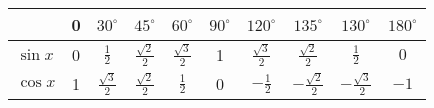 



	
 \label{sincoseksakt}
\begin{center}
	\renewcommand{\arraystretch}{1.5}	
	\begin{tabular}{l|c|c|c|c|c|c|c|c|c}
		& 0&$30^\circ$ & $45^\circ$ &$60^\circ$ & $90^\circ$ & $ 120^\circ $ & $ 135^\circ$ & $ 130^\circ $ & $ 180^\circ $    \\
		\hline
		$\sin x$ & 0 &$\frac{1}{2}$ & $\frac{\sqrt{2}}{2}$ & $\frac{\sqrt{3}}{2}$ & 1 & $ \frac{\sqrt{3}}{2} $ & $ \frac{\sqrt{2}}{2} $ & $ \frac{1}{2} $ & $ 0 $\\
		$\cos x$ & 1 & $\frac{\sqrt{3}}{2}$ & $\frac{\sqrt{2}}{2}$ & $\frac{1}{2}$ & 0 & $ -\frac{1}{2} $ & $ -\frac{\sqrt{2}}{2} $ & $ -\frac{\sqrt{3}}{2} $ & $ -1 $
	\end{tabular}
\end{center}
